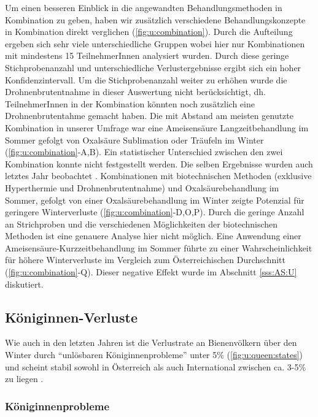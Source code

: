 Um einen besseren Einblick in die angewandten Behandlungsmethoden in Kombination zu geben, haben wir zusätzlich verschiedene Behandlungskonzepte in Kombination direkt verglichen (\cref{fig:u:combination}). Durch die Aufteilung ergeben sich sehr viele unterschiedliche Gruppen wobei hier nur Kombinationen mit mindestens 15 TeilnehmerInnen analysiert wurden. Durch diese geringe Stichprobenanzahl und unterschiedliche Verlustergebnisse ergibt sich ein hoher Konfidenzintervall. Um die Stichprobenanzahl weiter zu erhöhen wurde die Drohnenbrutentnahme in dieser Auswertung nicht berücksichtigt, dh. TeilnehmerInnen in der Kombination könnten noch zusätzlich eine Drohnenbrutentahme gemacht haben.
\newline
Die mit Abstand am meisten genutzte Kombination in unserer Umfrage war eine Ameisensäure Langzeitbehandlung im Sommer gefolgt von Oxalsäure Sublimation oder Träufeln im Winter (\cref{fig:u:combination}-A,B). Ein statistischer Unterschied zwischen den zwei Kombination konnte nicht festgestellt werden. Die selben Ergebnisse wurden auch letztes Jahr beobachtet \citep{oberreiter2020}.
\newline
Kombinationen mit biotechnischen Methoden (exklusive Hyperthermie und Drohnenbrutentnahme) und Oxalsäurebehandlung im Sommer, gefolgt von einer Oxalsäurebehandlung im Winter zeigte Potenzial für geringere Winterverluste (\cref{fig:u:combination}-D,O,P). Durch die geringe Anzahl an Strichproben und die verschiedenen Möglichkeiten der biotechnischen Methoden ist eine genauere Analyse hier nicht möglich. 
\newline
Eine Anwendung einer Ameisensäure-Kurzzeitbehandlung im Sommer führte zu einer Wahrscheinlichkeit für höhere Winterverluste im Vergleich zum Österreichischen Durchschnitt (\cref{fig:u:combination}-Q). Dieser negative Effekt wurde im Abschnitt \ref{sss:AS:U}  diskutiert.

\subsection{Königinnen-Verluste}

Wie auch in den letzten Jahren ist die Verlustrate an Bienenvölkern über den Winter durch \enquote{unlösbaren Königinnenprobleme} unter 5\% (\cref{fig:u:queen:states}) und scheint stabil sowohl in Österreich als auch International zwischen ca. 3-5\% zu liegen \citep{brodschneider2019, gray2019, oberreiter2020}.

\subsubsection{Königinnenprobleme}

